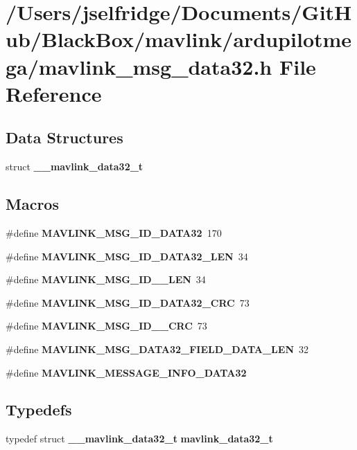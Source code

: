\section{/\+Users/jselfridge/\+Documents/\+Git\+Hub/\+Black\+Box/mavlink/ardupilotmega/mavlink\+\_\+msg\+\_\+data32.h File Reference}
\label{mavlink__msg__data32_8h}
\subsection*{Data Structures}
\begin{DoxyCompactItemize}
\item 
struct \textbf{ \+\_\+\+\_\+mavlink\+\_\+data32\+\_\+t}
\end{DoxyCompactItemize}
\subsection*{Macros}
\begin{DoxyCompactItemize}
\item 
\#define \textbf{ M\+A\+V\+L\+I\+N\+K\+\_\+\+M\+S\+G\+\_\+\+I\+D\+\_\+\+D\+A\+T\+A32}~170
\item 
\#define \textbf{ M\+A\+V\+L\+I\+N\+K\+\_\+\+M\+S\+G\+\_\+\+I\+D\+\_\+\+D\+A\+T\+A32\+\_\+\+L\+EN}~34
\item 
\#define \textbf{ M\+A\+V\+L\+I\+N\+K\+\_\+\+M\+S\+G\+\_\+\+I\+D\+\_\+\_\+\+L\+EN}~34
\item 
\#define \textbf{ M\+A\+V\+L\+I\+N\+K\+\_\+\+M\+S\+G\+\_\+\+I\+D\+\_\+\+D\+A\+T\+A32\+\_\+\+C\+RC}~73
\item 
\#define \textbf{ M\+A\+V\+L\+I\+N\+K\+\_\+\+M\+S\+G\+\_\+\+I\+D\+\_\+\_\+\+C\+RC}~73
\item 
\#define \textbf{ M\+A\+V\+L\+I\+N\+K\+\_\+\+M\+S\+G\+\_\+\+D\+A\+T\+A32\+\_\+\+F\+I\+E\+L\+D\+\_\+\+D\+A\+T\+A\+\_\+\+L\+EN}~32
\item 
\#define \textbf{ M\+A\+V\+L\+I\+N\+K\+\_\+\+M\+E\+S\+S\+A\+G\+E\+\_\+\+I\+N\+F\+O\+\_\+\+D\+A\+T\+A32}
\end{DoxyCompactItemize}
\subsection*{Typedefs}
\begin{DoxyCompactItemize}
\item 
typedef struct \textbf{ \+\_\+\+\_\+mavlink\+\_\+data32\+\_\+t} \textbf{ mavlink\+\_\+data32\+\_\+t}
\end{DoxyCompactItemize}


